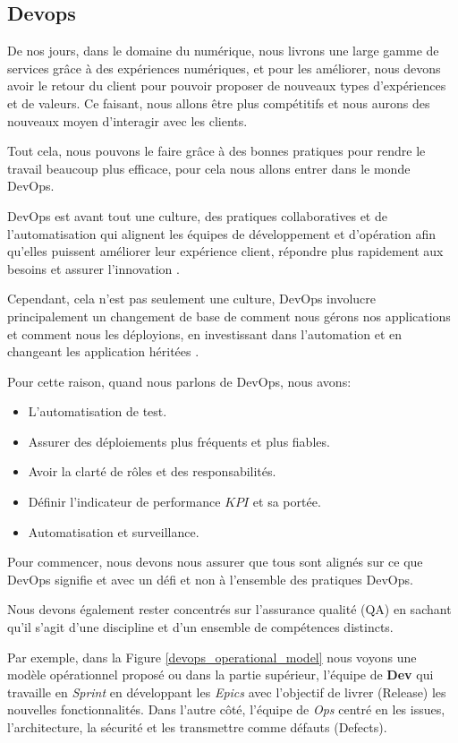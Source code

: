 \subsection{Devops}\label{sec:devops}
De nos jours, dans le domaine du numérique, nous livrons une large gamme de services grâce à des expériences numériques, et pour les améliorer, nous devons avoir le retour du client pour pouvoir proposer de nouveaux types d’expériences et de valeurs. Ce faisant, nous allons être plus compétitifs et nous aurons des nouveaux moyen d'interagir avec les clients.

Tout cela, nous pouvons le faire grâce à des bonnes pratiques pour rendre le travail beaucoup plus efficace, pour cela nous allons entrer dans le monde DevOps.

DevOps est avant tout une culture, des pratiques collaboratives et de l'automatisation qui alignent les équipes de développement et d'opération afin qu'elles puissent améliorer leur expérience client, répondre plus rapidement aux besoins et assurer l'innovation \cite{IsaacSacolick2016DrivingCulture}.

Cependant, cela n'est pas seulement une culture, DevOps involucre principalement un changement de base de comment nous gérons nos applications et comment nous les déployions, en investissant dans l'automation et en changeant les application héritées \cite{benjamin_wootton}.

Pour cette raison, quand nous parlons de DevOps, nous avons:

\begin{itemize}
\item L'automatisation de test.
\item Assurer des déploiements plus fréquents et plus fiables.
\item Avoir la clarté de rôles et des responsabilités.
\item Définir l'indicateur de performance \(KPI\) et sa portée.
\item Automatisation et surveillance.
\end{itemize}

Pour commencer, nous devons nous assurer que tous sont alignés sur ce que DevOps signifie et avec un défi et non à l’ensemble des pratiques DevOps.

Nous devons également rester concentrés sur l’assurance qualité (QA) en sachant qu’il s’agit d’une discipline et d’un ensemble de compétences distincts.

Par exemple, dans la Figure \ref{devops_operational_model} nous voyons une modèle opérationnel proposé ou dans la partie supérieur, l'équipe de \textbf{Dev} qui travaille en \textit{Sprint} en développant les \textit{Epics} avec l'objectif de livrer (Release) les nouvelles fonctionnalités. Dans l'autre côté, l'équipe de \textit{Ops} centré en les issues, l'architecture, la sécurité et les transmettre comme défauts (Defects).


